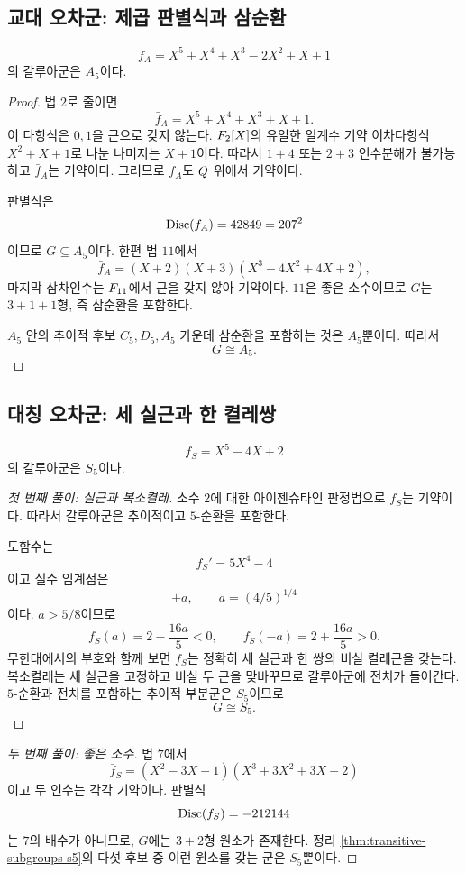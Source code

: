 \subsection{교대 오차군: 제곱 판별식과 삼순환}

\begin{example}
\label{ex:quintic-a5}
\[
  f_A=X^5+X^4+X^3-2X^2+X+1
\]
의 갈루아군은 $A_5$이다.
\end{example}

\begin{proof}
법 $2$로 줄이면
\[
  \bar f_A=X^5+X^4+X^3+X+1.
\]
이 다항식은 $0,1$을 근으로 갖지 않는다. $F_2[X]$의 유일한 일계수 기약 이차다항식 $X^2+X+1$로 나눈 나머지는 $X+1$이다. 따라서 $1+4$ 또는 $2+3$ 인수분해가 불가능하고 $\bar f_A$는 기약이다. 그러므로 $f_A$도 $Q$ 위에서 기약이다.

판별식은
\[
  \operatorname{Disc}(f_A)=42849=207^2
\]
이므로 $G\subseteq A_5$이다. 한편 법 $11$에서
\[
  \bar f_A
  =(X+2)(X+3)(X^3-4X^2+4X+2),
\]
마지막 삼차인수는 $F_{11}$에서 근을 갖지 않아 기약이다. $11$은 좋은 소수이므로 $G$는 $3+1+1$형, 즉 삼순환을 포함한다.

$A_5$ 안의 추이적 후보 $C_5,D_5,A_5$ 가운데 삼순환을 포함하는 것은 $A_5$뿐이다. 따라서
\[
  G\cong A_5.
\]
\end{proof}

\subsection{대칭 오차군: 세 실근과 한 켤레쌍}

\begin{example}
\label{ex:quintic-s5}
\[
  f_S=X^5-4X+2
\]
의 갈루아군은 $S_5$이다.
\end{example}

\begin{proof}[첫 번째 풀이: 실근과 복소켤레]
소수 $2$에 대한 아이젠슈타인 판정법으로 $f_S$는 기약이다. 따라서 갈루아군은 추이적이고 $5$-순환을 포함한다.

도함수는
\[
  f_S'=5X^4-4
\]
이고 실수 임계점은
\[
  \pm a,
  \qquad a=(4/5)^{1/4}
\]
이다. $a>5/8$이므로
\[
  f_S(a)=2-\frac{16a}{5}<0,
  \qquad
  f_S(-a)=2+\frac{16a}{5}>0.
\]
무한대에서의 부호와 함께 보면 $f_S$는 정확히 세 실근과 한 쌍의 비실 켤레근을 갖는다. 복소켤레는 세 실근을 고정하고 비실 두 근을 맞바꾸므로 갈루아군에 전치가 들어간다. $5$-순환과 전치를 포함하는 추이적 부분군은 $S_5$이므로
\[
  G\cong S_5.
\]
\end{proof}

\begin{proof}[두 번째 풀이: 좋은 소수]
법 $7$에서
\[
  \bar f_S
  =(X^2-3X-1)(X^3+3X^2+3X-2)
\]
이고 두 인수는 각각 기약이다. 판별식
\[
  \operatorname{Disc}(f_S)=-212144
\]
는 $7$의 배수가 아니므로, $G$에는 $3+2$형 원소가 존재한다. 정리 \ref{thm:transitive-subgroups-s5}의 다섯 후보 중 이런 원소를 갖는 군은 $S_5$뿐이다.
\end{proof}

